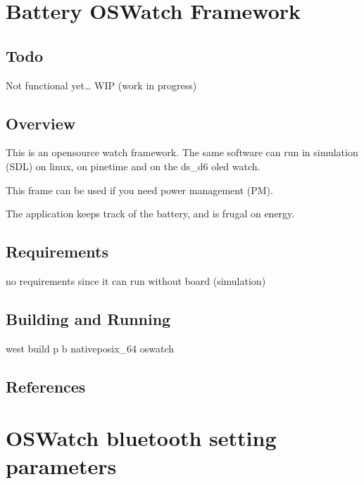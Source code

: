 \documentclass[letterpaper,10pt,english]{sphinxmanual}
\begin{document}
\section{Battery OSWatch Framework}
\label{\detokenize{samples/oswatch-batteryREADME:battery-oswatch-framework}}\label{\detokenize{samples/oswatch-batteryREADME:oswatch}}\label{\detokenize{samples/oswatch-batteryREADME::doc}}

\subsection{Todo}
\label{\detokenize{samples/oswatch-batteryREADME:todo}}
Not functional yet…
WIP (work in progress)


\subsection{Overview}
\label{\detokenize{samples/oswatch-batteryREADME:overview}}
This is an opensource watch framework.
The same software can run in simulation (SDL) on linux, on pinetime and on the ds\_d6 oled watch.

This frame can be used if you need power management (PM).

The application keeps track of the battery, and is frugal on energy.


\subsection{Requirements}
\label{\detokenize{samples/oswatch-batteryREADME:requirements}}
no requirements since it can run without board (simulation)


\subsection{Building and Running}
\label{\detokenize{samples/oswatch-batteryREADME:building-and-running}}
west build \sphinxhyphen{}p \sphinxhyphen{}b  native\sphinxhyphen{}posix\_64 oswatch


\subsection{References}
\label{\detokenize{samples/oswatch-batteryREADME:references}}

\section{OSWatch bluetooth setting parameters}
\label{\detokenize{samples/oswatch-btREADME:oswatch-bluetooth-setting-parameters}}\label{\detokenize{samples/oswatch-btREADME:oswatch}}\label{\detokenize{samples/oswatch-btREADME::doc}}
\end{document}
